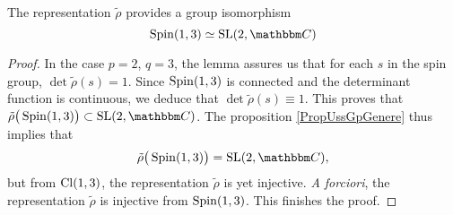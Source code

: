 \begin{theorem}
The representation $\tilde\rho$ provides a group isomorphism 
\[ 
  \Spin(1,3)\simeq \SL(2,\eC)
\]

\end{theorem}

\begin{proof}
In the case $p=2$, $q=3$, the lemma assures us that for each $s$ in the spin group, $\det\tilde\rho(s)=1$. Since $\operatorname{Spin}(1,3)$ is connected and the determinant function is continuous, we deduce that $\det\tilde\rho(s)\equiv 1$. This proves that $\tilde\rho\big( \Spin(1,3) \big)\subset \SL(2,\eC)$. The proposition \ref{PropUssGpGenere} thus implies that
\[ 
  \tilde\rho\big( \Spin(1,3) \big)=\SL(2,\eC),
\]
 but from $\operatorname{Cl}(1,3)$, the representation $\tilde\rho$ is yet injective. \emph{A forciori}, the representation $\tilde\rho$ is injective from $\operatorname{Spin}(1,3)$. This finishes the proof.
\end{proof}
